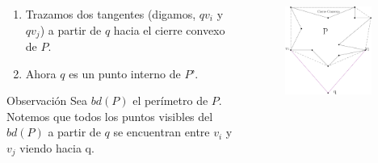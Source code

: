 \documentclass[aspectratio=169,xcolor=dvipsnames, t]{beamer}
\begin{document}
\begin{frame}{}
    \begin{columns}
    \begin{column}{0.45\textwidth}
        \begin{enumerate}
            \item Trazamos dos tangentes (digamos, $qv_{i}$ y $qv_{j}$) a partir de $q$ hacia el cierre convexo de $P$. 
            \item Ahora $q$ es un punto interno de $P’$.\\
        \end{enumerate}
    \begin{block}{Observación}
    \small
        Sea $bd(P)$ el perímetro de $P$. Notemos que todos los puntos visibles del $bd(P)$ a partir de $q$ se encuentran entre $v_{i}$ y $v_{j}$ viendo hacia q.
    \end{block}
    \end{column}
    \begin{column}{0.45\textwidth}  %
    \vspace{-1cm}
        \begin{figure}
            \centering
            \includegraphics[width=0.9\textwidth]{imagenes/Caso01.png}
        \end{figure}
    \end{column}
    \end{columns}
\end{frame}
\end{document}
